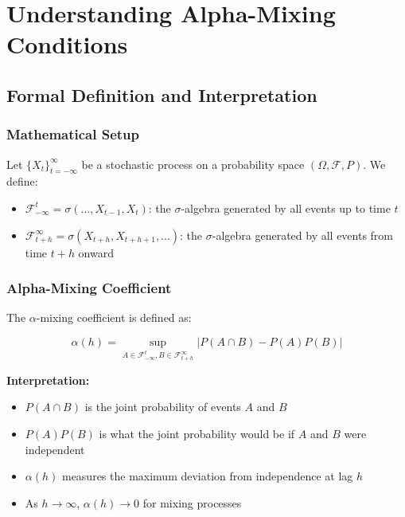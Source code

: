 \documentclass[12pt,article]{memoir}
\begin{document}
\tableofcontents

\section{Understanding Alpha-Mixing Conditions}

\subsection{Formal Definition and Interpretation}

\subsubsection{Mathematical Setup}

Let $\{X_t\}_{t=-\infty}^{\infty}$ be a stochastic process on a probability space $(\Omega, \mathcal{F}, P)$. We define:

\begin{itemize}
    \item $\mathcal{F}_{-\infty}^t = \sigma(..., X_{t-1}, X_t)$: the $\sigma$-algebra generated by all events up to time $t$
    \item $\mathcal{F}_{t+h}^{\infty} = \sigma(X_{t+h}, X_{t+h+1},...)$: the $\sigma$-algebra generated by all events from time $t+h$ onward
\end{itemize}

\subsubsection{Alpha-Mixing Coefficient}

The $\alpha$-mixing coefficient is defined as:

\begin{equation}
    \alpha(h) = \sup_{A \in \mathcal{F}_{-\infty}^t, B \in \mathcal{F}_{t+h}^{\infty}} |P(A \cap B) - P(A)P(B)|
\end{equation}

\textbf{Interpretation:}
\begin{itemize}
    \item $P(A \cap B)$ is the joint probability of events $A$ and $B$
    \item $P(A)P(B)$ is what the joint probability would be if $A$ and $B$ were independent
    \item $\alpha(h)$ measures the maximum deviation from independence at lag $h$
    \item As $h \to \infty$, $\alpha(h) \to 0$ for mixing processes
\end{itemize}
\end{document}
